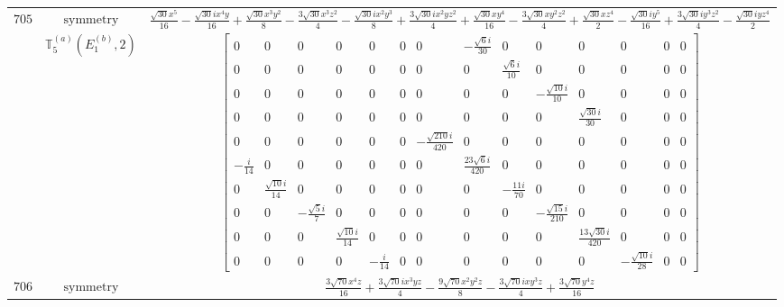 \documentclass[fleqn,8pt,landscape]{jsarticle}
\begin{document}
\begin{longtable}{ccc}
$ 705 $ & $ \text{symmetry} $ & $ \frac{\sqrt{30} x^{5}}{16} - \frac{\sqrt{30} i x^{4} y}{16} + \frac{\sqrt{30} x^{3} y^{2}}{8} - \frac{3 \sqrt{30} x^{3} z^{2}}{4} - \frac{\sqrt{30} i x^{2} y^{3}}{8} + \frac{3 \sqrt{30} i x^{2} y z^{2}}{4} + \frac{\sqrt{30} x y^{4}}{16} - \frac{3 \sqrt{30} x y^{2} z^{2}}{4} + \frac{\sqrt{30} x z^{4}}{2} - \frac{\sqrt{30} i y^{5}}{16} + \frac{3 \sqrt{30} i y^{3} z^{2}}{4} - \frac{\sqrt{30} i y z^{4}}{2} $ \\
$  $ & $ \mathbb{T}_{5}^{(a)}(E_{1}^{(b)},2) $ & $ \begin{bmatrix} 0 & 0 & 0 & 0 & 0 & 0 & 0 & - \frac{\sqrt{6} i}{30} & 0 & 0 & 0 & 0 & 0 & 0 \\ 0 & 0 & 0 & 0 & 0 & 0 & 0 & 0 & \frac{\sqrt{6} i}{10} & 0 & 0 & 0 & 0 & 0 \\ 0 & 0 & 0 & 0 & 0 & 0 & 0 & 0 & 0 & - \frac{\sqrt{10} i}{10} & 0 & 0 & 0 & 0 \\ 0 & 0 & 0 & 0 & 0 & 0 & 0 & 0 & 0 & 0 & \frac{\sqrt{30} i}{30} & 0 & 0 & 0 \\ 0 & 0 & 0 & 0 & 0 & 0 & - \frac{\sqrt{210} i}{420} & 0 & 0 & 0 & 0 & 0 & 0 & 0 \\ - \frac{i}{14} & 0 & 0 & 0 & 0 & 0 & 0 & \frac{23 \sqrt{6} i}{420} & 0 & 0 & 0 & 0 & 0 & 0 \\ 0 & \frac{\sqrt{10} i}{14} & 0 & 0 & 0 & 0 & 0 & 0 & - \frac{11 i}{70} & 0 & 0 & 0 & 0 & 0 \\ 0 & 0 & - \frac{\sqrt{5} i}{7} & 0 & 0 & 0 & 0 & 0 & 0 & - \frac{\sqrt{15} i}{210} & 0 & 0 & 0 & 0 \\ 0 & 0 & 0 & \frac{\sqrt{10} i}{14} & 0 & 0 & 0 & 0 & 0 & 0 & \frac{13 \sqrt{30} i}{420} & 0 & 0 & 0 \\ 0 & 0 & 0 & 0 & - \frac{i}{14} & 0 & 0 & 0 & 0 & 0 & 0 & - \frac{\sqrt{10} i}{28} & 0 & 0 \end{bmatrix} $ \\ \hline
$ 706 $ & $ \text{symmetry} $ & $ \frac{3 \sqrt{70} x^{4} z}{16} + \frac{3 \sqrt{70} i x^{3} y z}{4} - \frac{9 \sqrt{70} x^{2} y^{2} z}{8} - \frac{3 \sqrt{70} i x y^{3} z}{4} + \frac{3 \sqrt{70} y^{4} z}{16} $ \\

\end{longtable}
\end{document}
